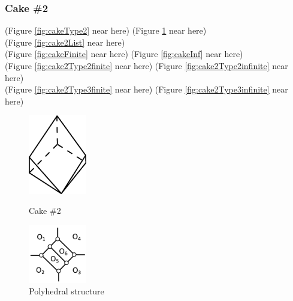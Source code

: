 \documentclass[suppldata, dvipdfmx]{interact}
\theoremstyle{plain}%
\theoremstyle{definition}
\theoremstyle{remark}
\theoremstyle{problemstyle}
\begin{document}
\subsubsection{Cake \#2}

\noindent(Figure \ref{fig:cakeType2} near here)
(Figure \ref{fig:polyhedralStructureCake2} near here)\\
(Figure \ref{fig:cake2List}
 near here)\\
(Figure \ref{fig:cakeFinite}
 near here)
(Figure \ref{fig:cakeInf}
 near here)\\
(Figure \ref{fig:cake2Type2finite}
 near here)
(Figure \ref{fig:cake2Type2infinite}
 near here)\\
(Figure \ref{fig:cake2Type3finite}
 near here)
(Figure \ref{fig:cake2Type3infinite}
 near here)

\begin{figure}[h!tbp]
  \begin{minipage}[t]{0.49\textwidth}
   \centering
   \includegraphics[width=1in, keepaspectratio]{./img/HexahedraWithSphericalFaces/hexahedralCake2/cake2.jpg}
   \caption{Cake \#2}
   \label{fig:cakeType2}
  \end{minipage}
 \hspace*{\fill}
  \begin{minipage}[t]{0.49\textwidth}
   \centering
   \includegraphics[width=1in, keepaspectratio]{./img/HexahedraWithSphericalFaces/hexahedralCake2/faces.jpg}
   \caption{Polyhedral structure}
   \label{fig:polyhedralStructureCake2}
  \end{minipage}
\end{figure}
\end{document}
